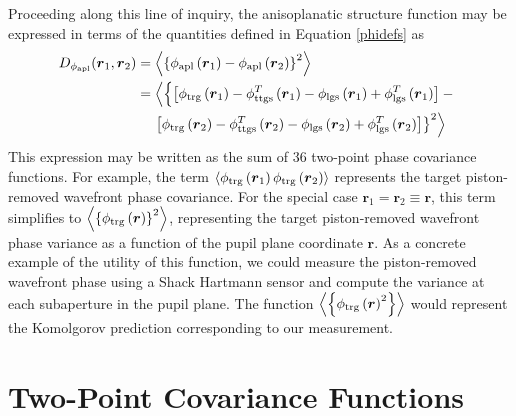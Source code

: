 Proceeding along this line of inquiry, the anisoplanatic structure
function may be expressed in terms of the quantities defined in
Equation \ref{phidefs} as
\begin{equation}\label{lgsstrfnexpansion}
\begin{split}
D_{\phi_{\rm apl}}(\boldsymbol{r}_{1},\boldsymbol{r}_{2}) & =
\left\langle \left\{\phi_{\rm apl}\left(\boldsymbol{r}_{1}\right) - 
\phi_{\rm apl}\left(\boldsymbol{r}_{2}\right)\right\}^{2}\right\rangle \\
& 
=\left\langle \left\{
\left[\phi_{\rm trg}\left(\boldsymbol{r}_{1}\right) - \phi^{T}_{\rm ttgs}\left(\boldsymbol{r}_{1}\right) - 
\phi_{\rm lgs}\left(\boldsymbol{r}_{1}\right) + \phi^{T}_{\rm lgs}\left(\boldsymbol{r}_{1}\right)\right] -
\vphantom{\left\langle\left\{\right\}^{2}\right\rangle}
\right.
\right.
\\
& \quad
\left.
\left.
\left[\phi_{\rm trg}\left(\boldsymbol{r}_{2}\right) - \phi^{T}_{\rm ttgs}\left(\boldsymbol{r}_{2}\right) - 
\phi_{\rm lgs}\left(\boldsymbol{r}_{2}\right) + \phi^{T}_{\rm lgs}\left(\boldsymbol{r}_{2}\right)\right]
\right\}^{2}\right\rangle  
\end{split}
\end{equation}
This expression may be written as the sum of 36 two-point phase
covariance functions.  For example, the term $\left\langle\phi_{\rm
  trg}\left(\boldsymbol{r}_{1}\right)\phi_{\rm
  trg}\left(\boldsymbol{r}_{2}\right)\right\rangle$ represents the
target piston-removed wavefront phase covariance.  For the special
case $\boldsymbol{r}_{1}=\boldsymbol{r}_{2}\equiv\boldsymbol{r}$, this
term simplifies to $\left\langle \left\{\phi_{\rm
  trg}\left(\boldsymbol{r}\right)\right\}^{2}\right\rangle$,
representing the target piston-removed wavefront phase variance as a
function of the pupil plane coordinate $\boldsymbol{r}$.  As a
concrete example of the utility of this function, we could measure the
piston-removed wavefront phase using a Shack Hartmann sensor and
compute the variance at each subaperture in the pupil plane.  The
function $\left\langle\left\{\phi_{\rm
  trg}\left(\boldsymbol{r}\right)^{2}\right\}\right\rangle$ would represent
the Komolgorov prediction corresponding to our measurement.

\section{Two-Point Covariance Functions}
\label{sec:covariance}

